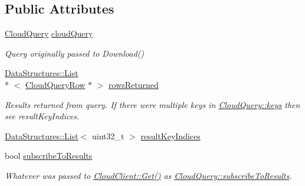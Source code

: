 \subsection*{Public Attributes}
\begin{DoxyCompactItemize}
\item 
\hypertarget{struct_rak_net_1_1_cloud_query_result_a8bdf20f346c90347e08e977d79ed8870}{\hyperlink{struct_rak_net_1_1_cloud_query}{Cloud\-Query} \hyperlink{struct_rak_net_1_1_cloud_query_result_a8bdf20f346c90347e08e977d79ed8870}{cloud\-Query}}\label{struct_rak_net_1_1_cloud_query_result_a8bdf20f346c90347e08e977d79ed8870}

\begin{DoxyCompactList}\small\item\em Query originally passed to Download() \end{DoxyCompactList}\item 
\hypertarget{struct_rak_net_1_1_cloud_query_result_a3ce6689d7869fa04098a74d1c00edfb1}{\hyperlink{class_data_structures_1_1_list}{Data\-Structures\-::\-List}\\*
$<$ \hyperlink{struct_rak_net_1_1_cloud_query_row}{Cloud\-Query\-Row} $\ast$ $>$ \hyperlink{struct_rak_net_1_1_cloud_query_result_a3ce6689d7869fa04098a74d1c00edfb1}{rows\-Returned}}\label{struct_rak_net_1_1_cloud_query_result_a3ce6689d7869fa04098a74d1c00edfb1}

\begin{DoxyCompactList}\small\item\em Results returned from query. If there were multiple keys in \hyperlink{struct_rak_net_1_1_cloud_query_a3a01154505b9a605142a8c95235d75ea}{Cloud\-Query\-::keys} then see result\-Key\-Indices. \end{DoxyCompactList}\item 
\hyperlink{class_data_structures_1_1_list}{Data\-Structures\-::\-List}$<$ uint32\-\_\-t $>$ \hyperlink{struct_rak_net_1_1_cloud_query_result_a75b780f5d71d00177effa21cc4f7a670}{result\-Key\-Indices}
\item 
\hypertarget{struct_rak_net_1_1_cloud_query_result_a84851dcf1bbd9a531c819b73e4c41c87}{bool \hyperlink{struct_rak_net_1_1_cloud_query_result_a84851dcf1bbd9a531c819b73e4c41c87}{subscribe\-To\-Results}}\label{struct_rak_net_1_1_cloud_query_result_a84851dcf1bbd9a531c819b73e4c41c87}

\begin{DoxyCompactList}\small\item\em Whatever was passed to \hyperlink{class_rak_net_1_1_cloud_client_a97bcdfb7e824f979efa7491d3c837204}{Cloud\-Client\-::\-Get()} as \hyperlink{struct_rak_net_1_1_cloud_query_a7c8c441b2801141bbba54946cc9ee4f7}{Cloud\-Query\-::subscribe\-To\-Results}. \end{DoxyCompactList}\end{DoxyCompactItemize}



